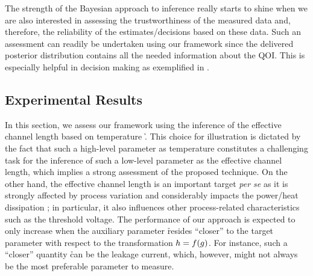 The strength of the Bayesian approach to inference really starts to shine when
we are also interested in assessing the trustworthiness of the measured data
and, therefore, the reliability of the estimates/decisions based on these data.
Such an assessment can readily be undertaken using our framework since the
delivered posterior distribution contains all the needed information about the
\ac{QOI}. This is especially helpful in decision making as exemplified in
.

\subsection{Experimental Results}

In this section, we assess our framework using the inference of the effective
channel length \g based on temperature \h. This choice for illustration is
dictated by the fact that such a high-level parameter as temperature constitutes
a challenging task for the inference of such a low-level parameter as the
effective channel length, which implies a strong assessment of the proposed
technique. On the other hand, the effective channel length is an important
target \emph{per se} as it is strongly affected by process variation and
considerably impacts the power/heat dissipation \cite{chandrakasan2000,
srivastava2010, juan2012}; in particular, it also influences other
process-related characteristics such as the threshold voltage. The performance
of our approach is expected to only increase when the auxiliary parameter \h
resides ``closer'' to the target parameter \g with respect to the transformation
$h = f(g)$. For instance, such a ``closer'' quantity \h can be the leakage
current, which, however, might not always be the most preferable parameter to
measure.


